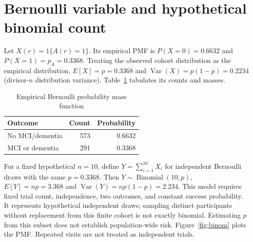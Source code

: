 \documentclass[11pt]{article}
\begin{document}
\section{Bernoulli variable and hypothetical binomial count}
Let $X(r)=1\{A(r)=1\}$. Its empirical PMF is $P(X=0)=0.6632$ and $P(X=1)=p_A=0.3368$. Treating the observed cohort distribution as the empirical distribution, $E[X]=p=0.3368$ and $\operatorname{Var}(X)=p(1-p)=0.2234$ (divisor-$n$ distribution variance). Table~\ref{tab:pmf} tabulates its counts and masses.
\begin{table}[H]\centering\caption{Empirical Bernoulli probability mass function}\label{tab:pmf}\begin{tabular}{lrr}\toprule Outcome & Count & Probability\\\midrule No MCI/dementia & 573 & 0.6632\\ MCI or dementia & 291 & 0.3368\\\bottomrule\end{tabular}\end{table}
For a fixed hypothetical $n=10$, define $Y=\sum_{i=1}^{10}X_i$ for independent Bernoulli draws with the same $p=0.3368$. Then $Y\sim\operatorname{Binomial}(10,p)$, $E[Y]=np=3.368$ and $\operatorname{Var}(Y)=np(1-p)=2.234$. This model requires fixed trial count, independence, two outcomes, and constant success probability. It represents hypothetical independent draws; sampling distinct participants without replacement from this finite cohort is not exactly binomial. Estimating $p$ from this subset does not establish population-wide risk. Figure~\ref{fig:binom} plots the PMF. Repeated visits are not treated as independent trials.
\end{document}
